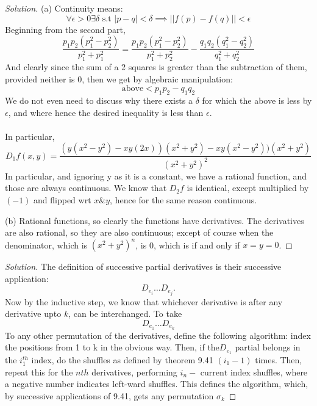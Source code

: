 \documentclass{article}
\newenvironment{problem}[2][Problem]{\begin{trivlist}
\item[\hskip \labelsep {\bfseries #1}\hskip \labelsep {\bfseries #2.}]}{\end{trivlist}}
\newenvironment{solution}{\begin{proof}[Solution]}{\end{proof}}
\begin{document}
\begin{solution}
	(a)	Continuity means: \[
		\forall \epsilon > 0 \exists \delta \text{ s.t } |p-q|<\delta \implies ||f(p)-f(q)||<\epsilon    
	\]
	Beginning from the second part, \[
		\frac{p_{1}p_{2}(p_{1}^{2}-p_{2}^{2})}{p_{1}^{2}+p_{1}^{2}}   = \frac{p_1 p_2(p_{1}^{2}-p_{2}^{2})}{p_{1}^{2}+p_{2}^{2}}- \frac{q_1 q_2(q_{1}^{2}-q_{2}^{2})}{q_{1}^{2}+q_{2}^{2}}   	
	\]
	And clearly since the sum of a 2 squares is greater than the subtraction of them, provided neither is 0, then we get by algebraic manipulation:
	\[
		\text{above}< p_1 p_2 - q_1 q_2
		\]
		We do not even need to discuss why there exists a $\delta$ for which the above is less by $\epsilon$, and where hence the desired inequality is less than $\epsilon$.
\\ \\
In particular, \[
	D_{1}f(x,y) = \frac{(y(x^{2}-y^{2})-xy(2x))(x^{2}+y^{2})- xy(x^{2}-y^{2}))(x^{2}+y^{2})}{(x^{2}+y^{2})^{2}}   
\]
In particular, and ignoring y as it is a constant, we have a rational function, and those are always continuous. We know that $D_{2}f$ is identical, except multiplied by $(-1)$ and flipped wrt $x \& y$, hence for the same reason continuous.

(b) Rational functions, so clearly the functions have derivatives. The derivatives are also rational, so they are also continuous; except of course when the denominator, which is $(x^{2}+y^{2})^{n}$, is 0, which is if and only if $x=y=0$. 
\end{solution}
\begin{problem}{9.29}
\end{problem}
\begin{solution}
	The definition of successive partial derivatives is their successive application: \[
		D_{e_{i}}\dots D_{e_{j}}.
	\]
	Now by the inductive step, we know that whichever derivative is after any derivative upto $k$, can be interchanged. To take \[
		D_{e_{1}}\dots D_{e_{k}}
	\] To any other permutation of the derivatives, define the following algorithm: index the positions from 1 to k in the obvious way. Then, if the$D_{e_{1}}$ partial belongs in the $i_{1}^{th}$ index, do the shuffles as defined by theorem 9.41 $(i_{1}-1)$ times. Then, repeat this for the $nth$ derivatives, performing $i_{n}- \text{ current index}$ shuffles, where a negative number indicates left-ward shuffles. This defines the algorithm, which, by successive applications of 9.41, gets any permutation $\sigma_{k}$

\end{solution}
\end{document}
